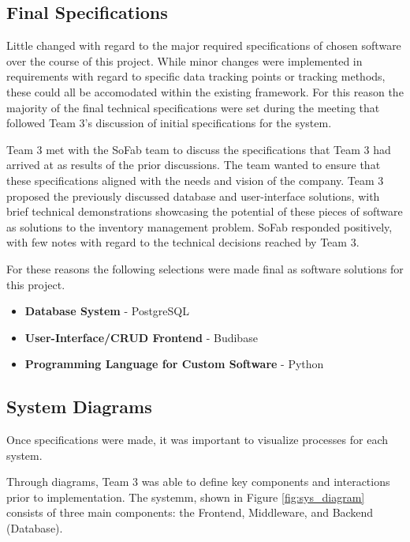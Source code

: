 \documentclass{article}
\begin{document}
\subsection{Final Specifications}
Little changed with regard to the major required specifications of chosen software over the course of this project. While minor changes
were implemented in requirements with regard to specific data tracking points or tracking methods, these could all be accomodated within
the existing framework. For this reason the majority of the final technical specifications were set during the meeting that followed
Team 3's discussion of initial specifications for the system.

Team 3 met with the SoFab team to discuss the specifications that Team 3 had arrived at as results of the prior discussions. The team 
wanted to ensure that these specifications aligned with the needs and vision of the company. Team 3 proposed the previously discussed
database and user-interface solutions, with brief technical demonstrations showcasing the potential of these pieces of software as 
solutions to the inventory management problem. SoFab responded positively, with few notes with regard to the technical decisions reached 
by Team 3. 

For these reasons the following selections were made final as software solutions for this project.

\begin{itemize}
    \item \textbf{Database System} - PostgreSQL
    \item \textbf{User-Interface\slash CRUD Frontend} - Budibase
    \item \textbf{Programming Language for Custom Software} - Python
\end{itemize}
\subsection{System Diagrams} 
Once specifications were made, it was important to visualize processes for each system.  

Through diagrams, Team 3 was able to define key components and interactions prior to implementation.  The systemm, shown in 
Figure \ref{fig:sys_diagram} consists of three main components: the Frontend, Middleware, and Backend (Database). 
\end{document}

